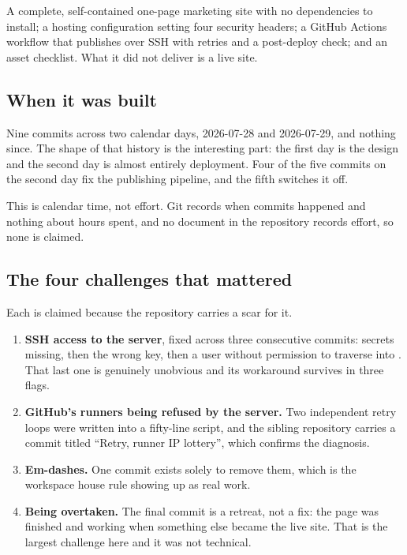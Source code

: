\documentclass[11pt,a4paper]{article}
\begin{document}
A complete, self-contained one-page marketing site with no dependencies to
install; a hosting configuration setting four security headers; a GitHub Actions
workflow that publishes over SSH with retries and a post-deploy check; and an
asset checklist. What it did not deliver is a live site.

\subsection{When it was built}

Nine commits across two calendar days, 2026-07-28 and 2026-07-29, and nothing
since. The shape of that history is the interesting part: the first day is the
design and the second day is almost entirely deployment. Four of the five commits
on the second day fix the publishing pipeline, and the fifth switches it off.

This is calendar time, not effort. Git records when commits happened and nothing
about hours spent, and no document in the repository records effort, so none is
claimed.

\subsection{The four challenges that mattered}

Each is claimed because the repository carries a scar for it.

\begin{enumerate}
\item \textbf{SSH access to the server}, fixed across three consecutive commits:
  secrets missing, then the wrong key, then a  user without
  permission to traverse into . That last one is genuinely unobvious
  and its workaround survives in three  flags.
\item \textbf{GitHub's runners being refused by the server.} Two independent retry
  loops were written into a fifty-line script, and the sibling repository
   carries a commit titled ``Retry, runner IP lottery'',
  which confirms the diagnosis.
\item \textbf{Em-dashes.} One commit exists solely to remove them, which is the
  workspace house rule showing up as real work.
\item \textbf{Being overtaken.} The final commit is a retreat, not a fix: the page
  was finished and working when something else became the live site. That is the
  largest challenge here and it was not technical.
\end{enumerate}
\end{document}
